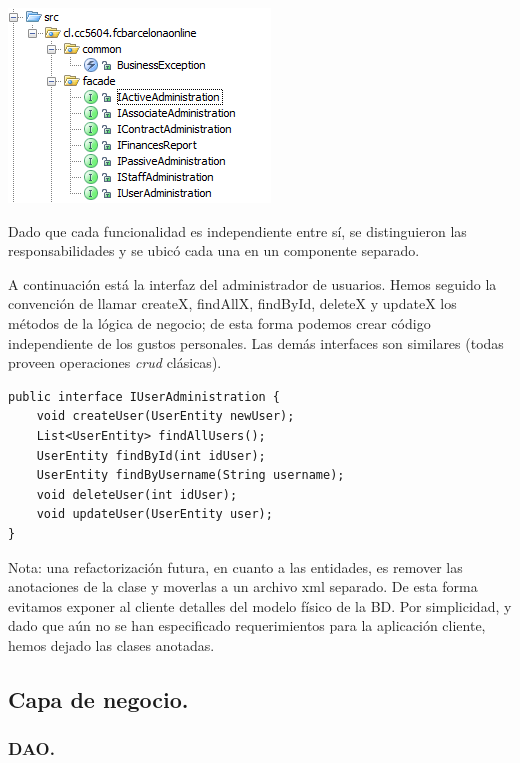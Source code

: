 \documentclass[letter]{article}
\begin{document}
\begin{center}
  \includegraphics{images/facade.png}
\end{center}

Dado que cada funcionalidad es independiente entre sí, se distinguieron las responsabilidades y se ubicó cada una en un componente separado.

A continuación está la interfaz del administrador de usuarios. Hemos seguido la convención de llamar createX, findAllX, findById, deleteX y updateX los métodos de la lógica de negocio; de esta forma podemos crear código independiente de los gustos personales. Las demás interfaces son similares (todas proveen operaciones \textit{crud} clásicas).

\begin{lstlisting}
public interface IUserAdministration {
    void createUser(UserEntity newUser);
    List<UserEntity> findAllUsers();
    UserEntity findById(int idUser);
    UserEntity findByUsername(String username);
    void deleteUser(int idUser);
    void updateUser(UserEntity user);
}

\end{lstlisting}

Nota: una refactorización futura, en cuanto a las entidades, es remover las anotaciones de la clase y moverlas a un archivo xml separado. De esta forma evitamos exponer al cliente detalles del modelo físico de la BD. Por simplicidad, y dado que aún no se han especificado requerimientos para la aplicación cliente, hemos dejado las clases anotadas.

\newpage

\subsection{Capa de negocio.}

\subsubsection{DAO.}
\end{document}
